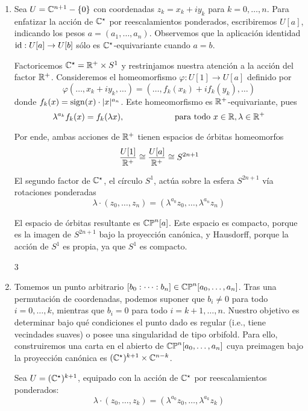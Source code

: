 \begin{solution}
\leavevmode
\begin{enumerate}[label=\alph*)]
    \item Sea $U = \mathbb C^{n+1} - \{ 0 \}$ con coordenadas $z_k = x_k + iy_k$ para $k = 0, \dots, n$. Para enfatizar la acción de $\mathbb C^\star$ por reescalamientos ponderados, escribiremos $U[a]$, indicando los pesos $a = (a_1, \dots, a_n)$. Observemos que la aplicación identidad $\operatorname{id} : U[a] \to U[b]$ sólo es $\mathbb C^\star$-equivariante cuando $a = b$.
    
    Factoricemos $\mathbb C^\star = \mathbb R^+ \times S^1$ y restrinjamos nuestra atención a la acción del factor $\mathbb R^+$. Consideremos el homeomorfismo $\varphi : U[1] \to U[a]$ definido por
    $$\varphi(\dots, x_k + iy_k, \dots) = (\dots, f_k(x_k) + if_k(y_k), \dots)$$
    donde $f_k(x) = \operatorname{sign}(x) \cdot |x|^{a_n}$. Este homeomorfismo es $\mathbb R^+$-equivariante, pues
    $$\lambda^{a_k} f_k(x) = f_k(\lambda x), \qquad \qquad \qquad \text{para todo } x \in \mathbb R, \lambda \in \mathbb R^+$$
    
    Por ende, ambas acciones de $\mathbb R^+$ tienen espacios de órbitas homeomorfos
    $$\frac {U[1]} {\mathbb R^+} \cong \frac {U[a]} {\mathbb R^+} \cong S^{2n+1}$$
    
    El segundo factor de $\mathbb C^\star$, el círculo $S^1$, actúa sobre la esfera $S^{2n+1}$ vía rotaciones ponderadas
    $$\lambda \cdot (z_0, \dots, z_n) = (\lambda^{a_0} z_0, \dots, \lambda^{a_n} z_n)$$
    
    El espacio de órbitas resultante es $\mathbb {CP}^n[a]$. Este espacio es compacto, porque es la imagen de $S^{2n+1}$ bajo la proyección canónica, y Hausdorff, porque la acción de $S^1$ es propia, ya que $S^1$ es compacto.
    
    \setcounter {enumi} 3
    
    \item Tomemos un punto arbitrario $[b_0 : \dots : b_n] \in \mathbb {CP}^n[a_0, \dots, a_n]$. Tras una permutación de coordenadas, podemos suponer que $b_i \ne 0$ para todo $i = 0, \dots, k$, mientras que $b_i = 0 $ para todo $i = k+1, \dots, n$. Nuestro objetivo es determinar bajo qué condiciones el punto dado es regular (i.e., tiene vecindades suaves) o posee una singularidad de tipo orbifold. Para ello, construiremos una carta en el abierto de $\mathbb {CP}^n[a_0, \dots, a_n]$ cuya preimagen bajo la proyección canónica es $(\mathbb C^\star)^{k+1} \times \mathbb C^{n-k}$.
    
    Sea $U = (\mathbb C^\star)^{k+1}$, equipado con la acción de $\mathbb C^\star$ por reescalamientos ponderados:
    $$\lambda \cdot (z_0, \dots, z_k) = (\lambda^{a_0} z_0, \dots, \lambda^{a_k} z_k)$$
    

\end{enumerate}
\end{solution}
